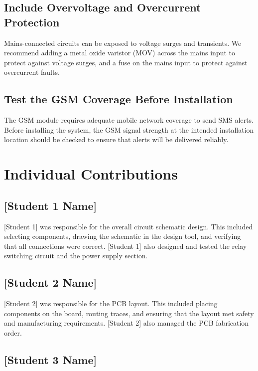 \documentclass[12pt,a4paper]{article}
\begin{document}
\subsection{Include Overvoltage and Overcurrent Protection}

Mains-connected circuits can be exposed to voltage surges and transients. We recommend adding a metal oxide varistor (MOV) across the mains input to protect against voltage surges, and a fuse on the mains input to protect against overcurrent faults.

\subsection{Test the GSM Coverage Before Installation}

The GSM module requires adequate mobile network coverage to send SMS alerts. Before installing the system, the GSM signal strength at the intended installation location should be checked to ensure that alerts will be delivered reliably.

\section{Individual Contributions}

\subsection{[Student 1 Name]}

[Student 1] was responsible for the overall circuit schematic design. This included selecting components, drawing the schematic in the design tool, and verifying that all connections were correct. [Student 1] also designed and tested the relay switching circuit and the power supply section.

\subsection{[Student 2 Name]}

[Student 2] was responsible for the PCB layout. This included placing components on the board, routing traces, and ensuring that the layout met safety and manufacturing requirements. [Student 2] also managed the PCB fabrication order.

\subsection{[Student 3 Name]}
\end{document}
